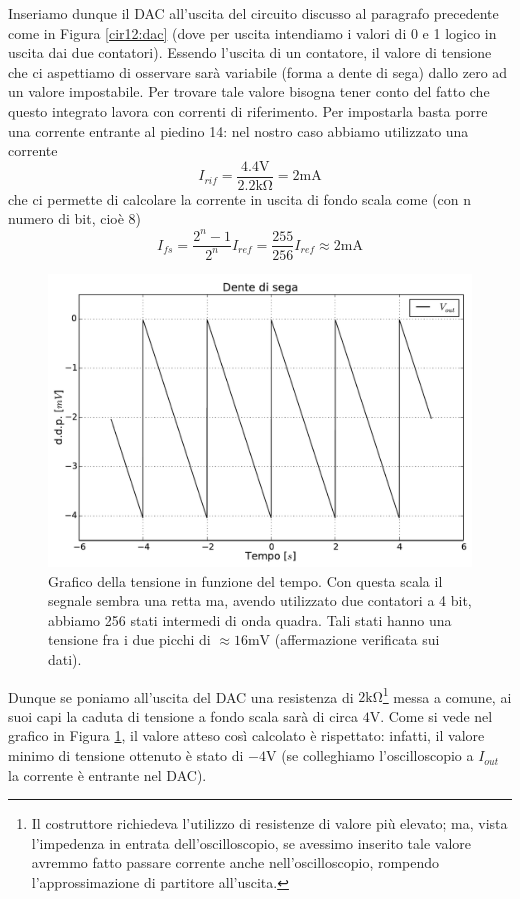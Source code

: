 Inseriamo dunque il DAC all'uscita del circuito discusso al paragrafo precedente come in Figura \ref{cir12:dac} (dove per uscita intendiamo i valori di 0 e 1 logico in uscita dai due contatori). Essendo l'uscita di un contatore, il valore di tensione che ci aspettiamo di osservare sarà variabile (forma a dente di sega) dallo zero ad un valore impostabile. Per trovare tale valore bisogna tener conto del fatto che questo integrato lavora con correnti di riferimento. Per impostarla basta porre una corrente entrante al piedino 14: nel nostro caso abbiamo utilizzato una corrente
$$I_{rif}=\frac{4.4 \si{\volt}}{2.2\si{\kilo\ohm}} = 2 \si{\milli\ampere}$$
che ci permette di calcolare la corrente in uscita di fondo scala come (con n numero di bit, cioè 8)
$$I_{fs}=\frac{2^n-1}{2^n} I_{ref} = \frac{255}{256} I_{ref} \approx 2 \si{\milli\ampere}$$

\begin{figure}[htpc]
\centering
	\includegraphics[width=.65\textwidth]{../E12/latex/sega.pdf}
	\caption{Grafico della tensione in funzione del tempo. Con questa scala il segnale sembra una retta ma, avendo utilizzato due contatori a 4 bit, abbiamo 256 stati intermedi di onda quadra. Tali stati hanno una tensione fra i due picchi di $\approx 16 \si{\milli \volt}$ (affermazione verificata sui dati).}
	\label{fig12:sega}
\end{figure}

Dunque se poniamo all'uscita del DAC una resistenza di $2 \si{\kilo\ohm}$\footnote{Il costruttore richiedeva l'utilizzo di resistenze di valore più elevato; ma, vista l'impedenza in entrata dell'oscilloscopio, se avessimo inserito tale valore avremmo fatto passare corrente anche nell'oscilloscopio, rompendo l'approssimazione di partitore all'uscita.} messa a comune, ai suoi capi la caduta di tensione a fondo scala sarà di circa $4 \si{\volt}$. Come si vede nel grafico in Figura \ref{fig12:sega}, il valore atteso così calcolato è rispettato: infatti, il valore minimo di tensione ottenuto è stato di $-4 \si{\volt}$ (se colleghiamo l'oscilloscopio a $I_{out}$ la corrente è entrante nel DAC).

